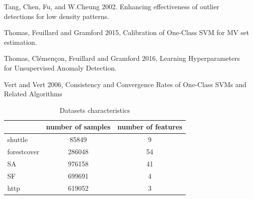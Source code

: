 \documentclass[9pt]{beamer}
\def\mb{\mathbf}
\begin{document}
\begin{frame}
\begin{itemize}
{\item Tang, Chen, Fu, and W.Cheung 2002. Enhancing effectiveness of outlier detections for low density patterns.

\item Thomas, Feuillard and Gramford 2015, Calibration of One-Class SVM for MV set estimation.

\item Thomas, Clémençon, Feuillard and Gramford 2016, Learning Hyperparameters for Unsupervised Anomaly Detection.

\item Vert and Vert 2006, Consistency and Convergence Rates of One-Class SVMs and Related Algorithms
}
\end{itemize}
\end{frame}




\begin{frame}
\begin{table}[h]
\centering
\begin{tabular}{lcc}
  \toprule
  ~           & number of samples  & number of features \\
  \midrule
  shuttle     & 85849              & 9                  \\
  forestcover & 286048             & 54                 \\
  SA          & 976158             & 41                 \\
  SF          & 699691             & 4                  \\
  http        & 619052             & 3                  \\
  \bottomrule
\end{tabular}
\caption{Datasets characteristics}
\label{table:data}


\end{table}
\end{frame}
\end{document}
